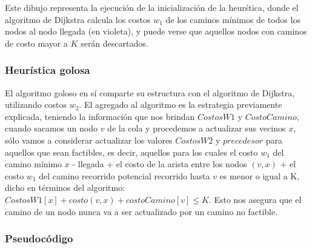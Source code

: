 Este dibujo representa la ejecuci\'on de la inicializaci\'on de la heur\'stica, donde el algoritmo de Dijkstra calcula los costos $w_1$ de los caminos m\'inimos de todos los nodos al nodo llegada (en violeta), y puede verse que aquellos nodos con caminos de costo mayor a $K$ ser\'an descartados.

\subsubsection{Heur\'istica golosa}

El algoritmo goloso en s\'i comparte su estructura con el algoritmo de Dijkstra, utilizando costos $w_2$. El agregado al algoritmo es la estrategia previamente explicada, teniendo la informaci\'on que nos brindan $CostosW1$ y $CostoCamino$, cuando sacamos un nodo $v$ de la cola y procedemos a actualizar sus vecinos $x$, s\'olo vamos a considerar actualizar los valores $CostosW2$ y $precedesor$ para aquellos que sean factibles, es decir, aquellos para los cuales el costo $w_1$ del camino m\'inimo $x$ - llegada + el costo de la arista entre los nodos $(v,x)$ + el costo $w_1$ del camino recorrido potencial recorrido hasta $v$ es menor o igual a K, dicho en t\'erminos del algoritmo: $CostosW1[x]+costo(v,x)+costoCamino[v]\leq K$. Esto nos asegura que el camino de un nodo nunca va a ser actualizado por un camino no factible.

\subsubsection{Pseudoc\'odigo}

